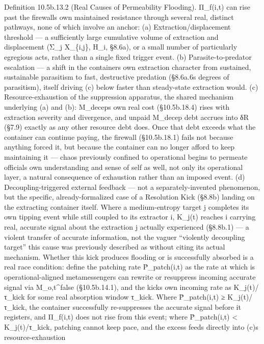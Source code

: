 \documentclass[
]{article}
\begin{document}
Definition 10.5b.13.2 (Real Causes of Permeability Flooding). Π\_f(i,t)
can rise past the firewalls own maintained resistance through several
real, distinct pathways, none of which involve an anchor: (a)
Extraction/displacement threshold --- a sufficiently large cumulative
volume of extraction and displacement (Σ\_j X\_\{i,j\}, H\_i, §8.6a), or
a small number of particularly egregious acts, rather than a single
fixed trigger event. (b) Parasite-to-predator escalation --- a shift in
the containers own extraction character from sustained, sustainable
parasitism to fast, destructive predation (§8.6a.6s degrees of
parasitism), itself driving (c) below faster than steady-state
extraction would. (c) Resource-exhaustion of the suppression apparatus,
the shared mechanism underlying (a) and (b): M\_deceps own real cost
(§10.5b.18.4) rises with extraction severity and divergence, and unpaid
M\_decep debt accrues into δR (§7.9) exactly as any other resource debt
does. Once that debt exceeds what the container can continue paying, the
firewall (§10.5b.18.1) fails not because anything forced it, but because
the container can no longer afford to keep maintaining it --- chaos
previously confined to operational begins to permeate officials own
understanding and sense of self as well, not only its operational layer,
a natural consequence of exhaustion rather than an imposed event. (d)
Decoupling-triggered external feedback --- not a separately-invented
phenomenon, but the specific, already-formalized case of a Resolution
Kick (§8.8b) landing on the extracting container itself. Where a
medium-entropy target j completes its own tipping event while still
coupled to its extractor i, K\_j(t) reaches i carrying real, accurate
signal about the extraction j actually experienced (§8.8b.1) --- a
violent transfer of accurate information, not the vaguer ``violently
decoupling target'' this cause was previously described as without
citing its actual mechanism. Whether this kick produces flooding or is
successfully absorbed is a real race condition: define the patching rate
Ṗ\_patch(i,t) as the rate at which is operational-aligned metamessengers
can rewrite or resuppress incoming accurate signal via M\_o,t\^{}false
(§10.5b.14.1), and the kicks own incoming rate as K\_j(t)/τ\_kick for
some real absorption window τ\_kick. Where Ṗ\_patch(i,t) ≥
K\_j(t)/τ\_kick, the container successfully re-suppresses the accurate
signal before it registers, and Π\_f(i,t) does not rise from this event;
where Ṗ\_patch(i,t) \textless{} K\_j(t)/τ\_kick, patching cannot keep
pace, and the excess feeds directly into (c)s resource-exhaustion
\end{document}
